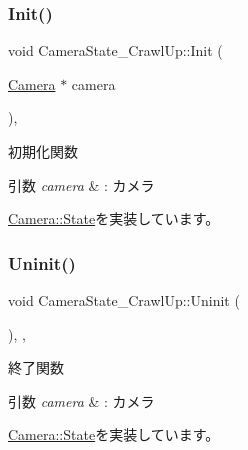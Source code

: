 \subsubsection{\texorpdfstring{Init()}{Init()}}
{\footnotesize\ttfamily void Camera\+State\+\_\+\+Crawl\+Up\+::\+Init (\begin{DoxyParamCaption}\item[{\mbox{\hyperlink{class_camera}{Camera}} $\ast$}]{camera }\end{DoxyParamCaption})\hspace{0.3cm}{\ttfamily [override]}, {\ttfamily [virtual]}}



初期化関数 


\begin{DoxyParams}{引数}
{\em camera} & \+: カメラ \\
\hline
\end{DoxyParams}


\mbox{\hyperlink{class_camera_1_1_state_aa1b81471ab15e64b3117ffe7de9560ff}{Camera\+::\+State}}を実装しています。

\mbox{\label{class_camera_state___crawl_up_a046ec18a91e31b210ae000133fa6113a}} 
\subsubsection{\texorpdfstring{Uninit()}{Uninit()}}
{\footnotesize\ttfamily void Camera\+State\+\_\+\+Crawl\+Up\+::\+Uninit (\begin{DoxyParamCaption}{ }\end{DoxyParamCaption})\hspace{0.3cm}{\ttfamily [inline]}, {\ttfamily [override]}, {\ttfamily [virtual]}}



終了関数 


\begin{DoxyParams}{引数}
{\em camera} & \+: カメラ \\
\hline
\end{DoxyParams}


\mbox{\hyperlink{class_camera_1_1_state_adb3f43b6c3f8100da7877867180e804b}{Camera\+::\+State}}を実装しています。

\mbox{\label{class_camera_state___crawl_up_aaebd2634f1677b7c00e6761ed91e1264}} 
